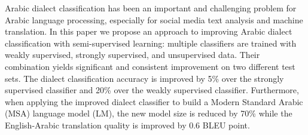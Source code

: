 Arabic dialect classification has been an important and challenging problem for Arabic language processing, especially for social media text analysis and machine translation. In this paper we propose  an approach to improving Arabic dialect classification with semi-supervised learning: multiple classifiers are trained with weakly supervised, strongly supervised, and unsupervised data. Their combination yields significant and consistent improvement on two different test sets. The dialect classification accuracy is improved by 5\% over the strongly supervised classifier and 20\% over the weakly supervised classifier. Furthermore, when applying the improved dialect classifier to build a Modern Standard Arabic (MSA) language model (LM), the new model size is reduced by 70\% while the English-Arabic translation quality is improved  by 0.6 BLEU point.
